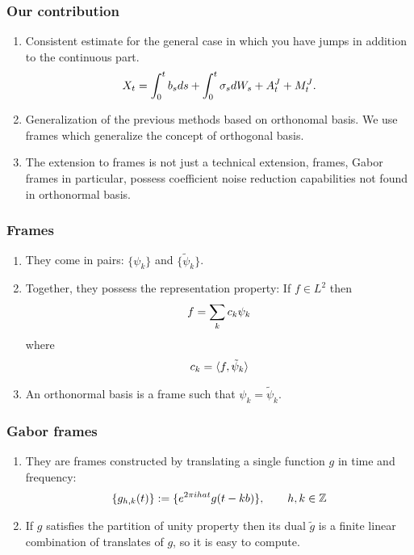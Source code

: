 \documentclass[fleqn]{beamer}
\begin{document}
\begin{frame}
  \frametitle{Our contribution}
  \begin{enumerate}
    \item Consistent estimate for the general case in which you have jumps in addition to the continuous part. 
    \begin{align}
        X_t = \int^t_0 b_s d s + \int^t_0 \sigma_s d W_s + A_t^J + M_t^J. \notag
    \label{}
  \end{align}
    \item Generalization of the previous methods based on orthonomal basis. We use frames which generalize the concept of orthogonal basis.
    \item The extension to frames is not just a technical extension, frames, Gabor frames in particular, possess coefficient noise reduction capabilities not found in orthonormal basis.  
  \end{enumerate}
\end{frame}
\begin{frame}
  \frametitle{Frames}
  \begin{enumerate}
    \item They come in pairs: $\{\psi_k\}$ and $\{\tilde{\psi}_k\}$.
    \item Together, they possess the representation property: If $f \in L^2$ then
      \begin{align}
        f = \sum_k c_k  \psi_k \notag
        \label{}
      \end{align}
      where
      \begin{align}
        c_k = \langle f, \tilde{\psi}_k\rangle \notag
        \label{}
      \end{align}
    \item An orthonormal basis is a frame such that $\psi_k = \tilde{\psi}_k$.
  \end{enumerate}

\end{frame}
\begin{frame}
  \frametitle{Gabor frames}
  \begin{enumerate}
    \item They are frames constructed by translating a single function $g$ in time and frequency:
      \begin{align}
        \{g_{h,k}(t) \} :=  \{e^{2\pi i h a t}g(t -k b)\}, \qquad h, k \in \mathbb{Z} \notag
        \label{}
      \end{align}
    \item If $g$ satisfies the partition of unity property then its dual  $\tilde{g}$ is a finite linear combination of translates of $g$, so it is easy to compute.
  \end{enumerate}   
\end{frame}
\end{document}
